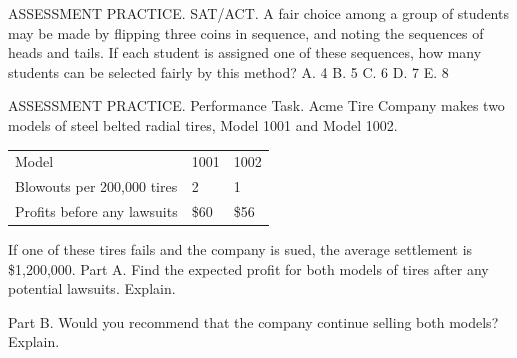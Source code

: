 \documentclass{article}
\newenvironment{practice}[2]{}{}        %
\newcommand{\answer}[1]{}               %
\newcommand{\placeholder}[2]{}          %
\begin{document}
\begin{practice}{25}{2}
ASSESSMENT PRACTICE. SAT/ACT. A fair choice among a group of students may be made by flipping three coins in sequence, and noting the sequences of heads and tails. If each student is assigned one of these sequences, how many students can be selected fairly by this method?
A. 4
B. 5
C. 6
D. 7
E. 8
\answer{E}
\end{practice}
\begin{practice}{26}{3}
ASSESSMENT PRACTICE. Performance Task. Acme Tire Company makes two models of steel belted radial tires, Model 1001 and Model 1002.
\begin{tabular}{lll}
Model & 1001 & 1002 \\
Blowouts per 200,000 tires & 2 & 1 \\
Profits before any lawsuits & \$60 & \$56 \\
\end{tabular}
\placeholder{illustration}{Two black treaded tires, one flat and one leaning across it; model information in callouts above, transcribed in the table.}
If one of these tires fails and the company is sued, the average settlement is \$1,200,000.
Part A. Find the expected profit for both models of tires after any potential lawsuits. Explain.
\answer{Part A Model 1001: \$48; Model 1002: \$50; Calculate the expected profit after potential lawsuits for each model like this: Model 1001: (\$60-(\$1,200,000)(\frac2{200,000})=\$48). Model 1002: (\$56-(\$1,200,000)(\frac1{200,000})=\$50).}
Part B. Would you recommend that the company continue selling both models? Explain.
\answer{Part B It is recommended that the company stop selling Model 1001 and only sell Model 1002. The company can expect to make more money on Model 1002 than on Model 1001. Also, Model 1002 is a safer tire; fewer people will be injured or die if they have Model 1002 tires than if they have Model 1001 tires.}
\end{practice}
\end{document}
